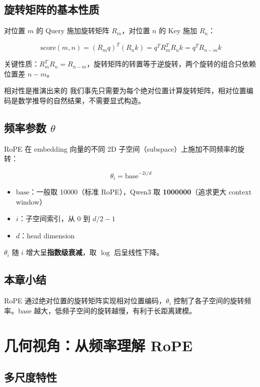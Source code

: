 \documentclass[a4paper]{article}
\begin{document}
\subsection{旋转矩阵的基本性质}

对位置 $m$ 的 Query 施加旋转矩阵 $R_m$，对位置 $n$ 的 Key 施加 $R_n$：

$$
\text{score}(m, n) = (R_m q)^T (R_n k) = q^T R_m^T R_n k = q^T R_{n-m} k
$$

关键性质：$R_m^T R_n = R_{n-m}$，旋转矩阵的转置等于逆旋转，两个旋转的组合只依赖位置差 $n - m$。

\begin{warningbox}{相对性是推演出来的}
我们事先只需要为每个绝对位置计算旋转矩阵，相对位置编码是数学推导的自然结果，不需要显式构造。
\end{warningbox}

\subsection{频率参数 $\theta$}

RoPE 在 embedding 向量的不同 2D 子空间（subspace）上施加不同频率的旋转：

$$
\theta_i = \text{base}^{-2i/d}
$$

\begin{itemize}
  \item $\text{base}$：一般取 10000（标准 RoPE），Qwen3 取 \textbf{1000000}（追求更大 context window）
  \item $i$：子空间索引，从 0 到 $d/2 - 1$
  \item $d$：head dimension
\end{itemize}

$\theta_i$ 随 $i$ 增大呈\textbf{指数级衰减}，取 $\log$ 后呈线性下降。

\subsection{本章小结}

RoPE 通过绝对位置的旋转矩阵实现相对位置编码，$\theta_i$ 控制了各子空间的旋转频率。base 越大，低频子空间的旋转越慢，有利于长距离建模。

\section{几何视角：从频率理解 RoPE}

\subsection{多尺度特性}
\end{document}
